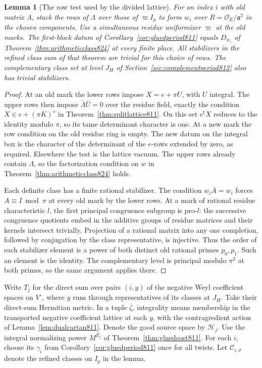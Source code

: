 \documentclass[a4paper,11pt]{article}
\newtheorem{lemma}[proposition]{Lemma}
\theoremstyle{definition}
\theoremstyle{remark}
\numberwithin{equation}{section}
\begin{document}
\begin{lemma}[The row test used by the divided lattice]
\leavevmode\label{lem:gluedrow844}
For an index \(i\) with old matrix \(\Lambda\), stack the rows of
\(\Lambda\) over those of \(\varpi I_p\) to form \(w_i\) over
\(R=\mathcal O_E/\mathfrak a^2\) in the chosen components. Use
a simultaneous residue uniformizer \(\varpi\) at the old marks.
The first-block datum of Corollary~\ref{cor:gluedperiod811} equals
\(D_{w_i}\) of Theorem~\ref{thm:arithmeticclass824} at every finite
place. All stabilizers in the refined class sum of that theorem
are trivial for this choice of rows. The complementary class set
at level \(J_H\) of Section~\ref{sec:complementperiod812} also has
trivial stabilizers.
\end{lemma}
\begin{proof}
At an old mark the lower rows impose \(X=e+\pi U\), with \(U\)
integral. The upper rows then impose
\(\bar\Lambda\bar U=0\) over the residue field, exactly the condition
\(X\in e+(\pi K)^s\) in Theorem~\ref{thm:splitlattice811}.
On this set \(e^{\mathsf t}X\) reduces to the identity modulo \(\pi\),
so its tame determinant character is one. At a new mark the row
condition on the old residue ring is empty. The new datum on the
integral box is the character of the determinant of the \(e\)-rows
extended by zero, as required. Elsewhere the test is the lattice
vacuum. The upper rows already contain \(\Lambda\), so the
factorization condition on \(w\) in Theorem~\ref{thm:arithmeticclass824}
holds.

Each definite class has a finite rational stabilizer. The condition
\(w_i\bar A=w_i\) forces \(A\equiv I\bmod\pi\) at every old mark
by the lower rows. At a mark of rational residue characteristic
\(l\), the first principal congruence subgroup is pro-\(l\):
the successive congruence quotients embed in the additive groups
of residue matrices and their kernels intersect trivially.
Projection of a rational matrix into any one completion, followed
by conjugation by the class representative, is injective. Thus the
order of each stabilizer element is a power of both distinct old
rational primes \(p_0,p_1\). Such an element is the identity. The
complementary level is principal modulo \(\pi^2\) at both primes,
so the same argument applies there.
\end{proof}

Write \(T_j\) for the direct sum over pairs \((i,y)\) of the negative
Weyl coefficient spaces on \(V^\circ\), where \(y\) runs through
representatives of its classes at \(J_H\). Take their direct-sum
Hermitian metric. In a tuple \(\zeta\), integrality means membership
in the transported negative coefficient lattice at each \(y\), with
the contragredient action of Lemma~\ref{lem:dualcartan811}. Denote
the good source space by \(\mathcal H_j\). Use the integral
normalizing power \(M^{E_j}\) of Theorem~\ref{thm:gluedcost811}.
For each \(i\), choose its \(\gamma_i\) from
Corollary~\ref{cor:gluedperiod811} once for all twists. Let
\(\mathcal C_{i,\vartheta}\) denote the refined classes on \(I_p\)
in the lemma.
\end{document}
